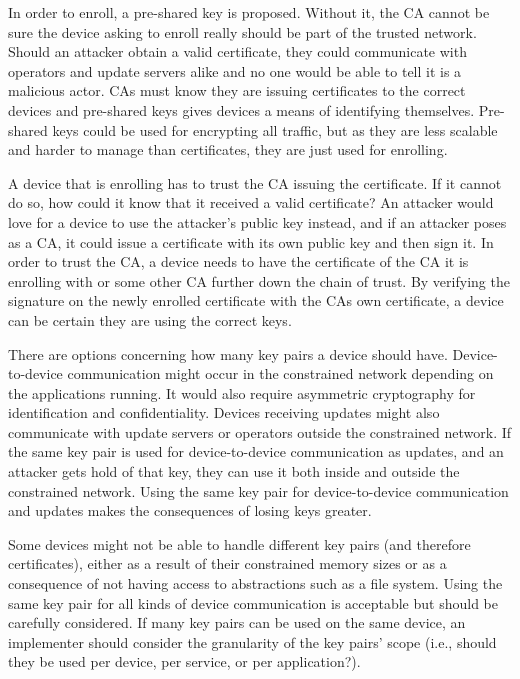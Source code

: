 \documentclass[0-thesis.tex]{subfiles}
\begin{document}
In order to enroll, a pre-shared key is proposed. Without it, the CA cannot be sure the
device asking to enroll really should be part of the trusted network. Should an attacker
obtain a valid certificate, they could communicate with operators and update servers alike
and no one would be able to tell it is a malicious actor. CAs must know they are issuing
certificates to the correct devices and pre-shared keys gives devices a means of
identifying themselves. Pre-shared keys could be used for encrypting all traffic, but as
they are less scalable and harder to manage than certificates, they are just used for
enrolling.

A device that is enrolling has to trust the CA issuing the certificate. If it cannot do
so, how could it know that it received a valid certificate? An attacker would love for a
device to use the attacker's public key instead, and if an attacker poses as a CA, it
could issue a certificate with its own public key and then sign it. In order to trust the
CA, a device needs to have the certificate of the CA it is enrolling with or some other CA
further down the chain of trust. By verifying the signature on the newly enrolled
certificate with the CAs own certificate, a device can be certain they are using the
correct keys.

There are options concerning how many key pairs a device should have. Device-to-device
communication might occur in the constrained network depending on the applications
running. It would also require asymmetric cryptography for identification and
confidentiality. Devices receiving updates might also communicate with update servers or
operators outside the constrained network. If the same key pair is used for
device-to-device communication as updates, and an attacker gets hold of that key, they can
use it both inside and outside the constrained network. Using the same key pair for
device-to-device communication and updates makes the consequences of losing keys greater. 

Some devices might not be able to handle different key pairs (and therefore certificates),
either as a result of their constrained memory sizes or as a consequence of not having
access to abstractions such as a file system. Using the same key pair for all kinds of
device communication is acceptable but should be carefully considered. If many key pairs
can be used on the same device, an implementer should consider the granularity of the key
pairs' scope (i.e., should they be used per device, per service, or per application?).
\end{document}
